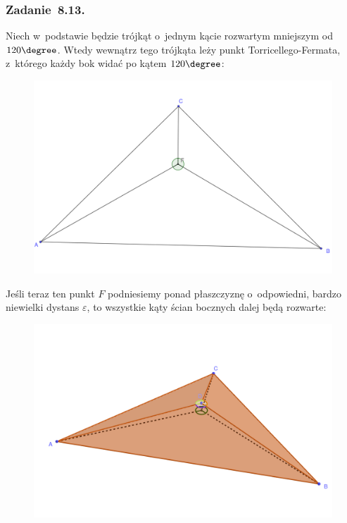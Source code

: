\subsubsection*{Zadanie~8.13.}
Niech w~podstawie będzie trójkąt o~jednym kącie rozwartym mniejszym od \(120\degree\). Wtedy wewnątrz tego trójkąta leży punkt Torricellego-Fermata, z~którego każdy bok widać po kątem \(120\degree\):
\begin{figure}[H]
    \centering
    \includegraphics[scale=0.7]{img/2021_02_11/13/plane.png}
\end{figure}
\noindent
Jeśli teraz ten punkt \(F\) podniesiemy ponad płaszczyznę o~odpowiedni, bardzo niewielki dystans \(\varepsilon\), to wszystkie kąty ścian bocznych dalej będą rozwarte:
\begin{figure}[H]
    \centering
    \includegraphics[scale=0.15]{img/2021_02_11/13/space.png}
\end{figure}
